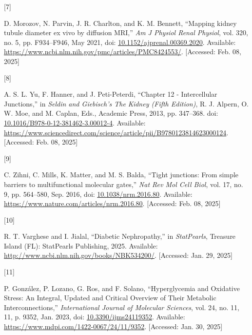 \documentclass[
  paper=a4,
  ,captions=tableheading
]{scrartcl}
\newlength{\cslhangindent}
\newlength{\csllabelwidth}
\newenvironment{CSLReferences}[2] %
  {\begin{list}{}{%
   \setlength{\itemindent}{0pt}
   \setlength{\leftmargin}{0pt}
   \setlength{\parsep}{0pt}
   \ifodd #1
    \setlength{\leftmargin}{\cslhangindent}
    \setlength{\itemindent}{-1\cslhangindent}
   \fi
   \setlength{\itemsep}{#2\baselineskip}}}
  {\end{list}}
\newcommand{\CSLLeftMargin}[1]{\parbox[t]{\csllabelwidth}{\strut#1\strut}}
\newcommand{\CSLRightInline}[1]{\parbox[t]{\linewidth - \csllabelwidth}{\strut#1\strut}}
\begin{document}
\begin{CSLReferences}{0}{0}
\CSLLeftMargin{{[}7{]} }%
\CSLRightInline{D. Morozov, N. Parvin, J. R. Charlton, and K. M.
Bennett, {``Mapping kidney tubule diameter ex vivo by diffusion
{MRI},''} \emph{Am J Physiol Renal Physiol}, vol. 320, no. 5, pp.
F934--F946, May 2021, doi:
\href{https://doi.org/10.1152/ajprenal.00369.2020}{10.1152/ajprenal.00369.2020}.
Available: \url{https://www.ncbi.nlm.nih.gov/pmc/articles/PMC8424553/}.
{[}Accessed: Feb. 08, 2025{]}}

\CSLLeftMargin{{[}8{]} }%
\CSLRightInline{A. S. L. Yu, F. Hanner, and J. Peti-Peterdi, {``Chapter
12 - {Intercellular Junctions},''} in \emph{Seldin and {Giebisch}'s {The
Kidney} ({Fifth Edition})}, R. J. Alpern, O. W. Moe, and M. Caplan,
Eds., Academic Press, 2013, pp. 347--368. doi:
\href{https://doi.org/10.1016/B978-0-12-381462-3.00012-4}{10.1016/B978-0-12-381462-3.00012-4}.
Available:
\url{https://www.sciencedirect.com/science/article/pii/B9780123814623000124}.
{[}Accessed: Feb. 08, 2025{]}}

\CSLLeftMargin{{[}9{]} }%
\CSLRightInline{C. Zihni, C. Mills, K. Matter, and M. S. Balda, {``Tight
junctions: From simple barriers to multifunctional molecular gates,''}
\emph{Nat Rev Mol Cell Biol}, vol. 17, no. 9, pp. 564--580, Sep. 2016,
doi: \href{https://doi.org/10.1038/nrm.2016.80}{10.1038/nrm.2016.80}.
Available: \url{https://www.nature.com/articles/nrm.2016.80}.
{[}Accessed: Feb. 08, 2025{]}}

\CSLLeftMargin{{[}10{]} }%
\CSLRightInline{R. T. Varghese and I. Jialal, {``Diabetic
{Nephropathy},''} in \emph{{StatPearls}}, Treasure Island (FL):
StatPearls Publishing, 2025. Available:
\url{http://www.ncbi.nlm.nih.gov/books/NBK534200/}. {[}Accessed: Jan.
29, 2025{]}}

\CSLLeftMargin{{[}11{]} }%
\CSLRightInline{P. González, P. Lozano, G. Ros, and F. Solano,
{``Hyperglycemia and {Oxidative Stress}: {An Integral}, {Updated} and
{Critical Overview} of {Their Metabolic Interconnections},''}
\emph{International Journal of Molecular Sciences}, vol. 24, no. 11, 11,
p. 9352, Jan. 2023, doi:
\href{https://doi.org/10.3390/ijms24119352}{10.3390/ijms24119352}.
Available: \url{https://www.mdpi.com/1422-0067/24/11/9352}. {[}Accessed:
Jan. 30, 2025{]}}


\end{CSLReferences}
\end{document}
